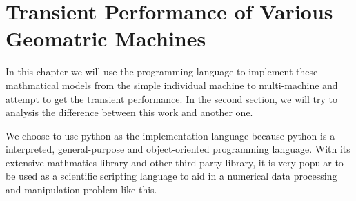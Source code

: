 \chapter{Transient Performance of Various Geomatric Machines}
\label{C_Kapitel}
\noindent In this chapter we will use the programming language to implement these mathmatical models from the simple individual machine to multi-machine and attempt to get the transient performance. In the second section, we will try to analysis the difference between this work and another one. 

We choose to use python as the implementation language because python is a interpreted, general-purpose and object-oriented programming language. With its extensive mathmatics library and other third-party library, it is very popular to be used as a scientific scripting language to aid in a numerical data processing and manipulation problem like this.


